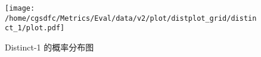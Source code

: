 \begin{figure}[H]%
\centering%
\texttt{[image: /home/cgsdfc/Metrics/Eval/data/v2/plot/distplot\_grid/distinct\_1/plot.pdf]}%
\caption{Distinct{-}1 的概率分布图}%
\label{fig:Distinct{-}1dist}%
\end{figure}